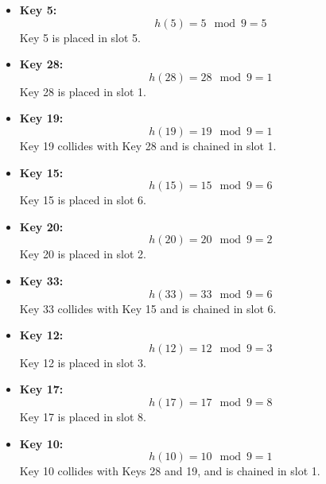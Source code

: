 \documentclass[11pt]{article}
\theoremstyle{definition}
\begin{document}
\begin{itemize}
    \item \textbf{Key 5:} 
    \begin{equation*}
    h(5) = 5 \mod 9 = 5
    \end{equation*}
    Key 5 is placed in slot 5.

    \item \textbf{Key 28:} 
    \begin{equation*}
    h(28) = 28 \mod 9 = 1
    \end{equation*}
    Key 28 is placed in slot 1.

    \item \textbf{Key 19:} 
    \begin{equation*}
    h(19) = 19 \mod 9 = 1
    \end{equation*}
    Key 19 collides with Key 28 and is chained in slot 1.

    \item \textbf{Key 15:} 
    \begin{equation*}
    h(15) = 15 \mod 9 = 6
    \end{equation*}
    Key 15 is placed in slot 6.

    \item \textbf{Key 20:} 
    \begin{equation*}
    h(20) = 20 \mod 9 = 2
    \end{equation*}
    Key 20 is placed in slot 2.

    \item \textbf{Key 33:} 
    \begin{equation*}
    h(33) = 33 \mod 9 = 6
    \end{equation*}
    Key 33 collides with Key 15 and is chained in slot 6.

    \item \textbf{Key 12:} 
    \begin{equation*}
    h(12) = 12 \mod 9 = 3
    \end{equation*}
    Key 12 is placed in slot 3.

    \item \textbf{Key 17:} 
    \begin{equation*}
    h(17) = 17 \mod 9 = 8
    \end{equation*}
    Key 17 is placed in slot 8.

    \item \textbf{Key 10:} 
    \begin{equation*}
    h(10) = 10 \mod 9 = 1
    \end{equation*}
    Key 10 collides with Keys 28 and 19, and is chained in slot 1.
\end{itemize}
\end{document}
